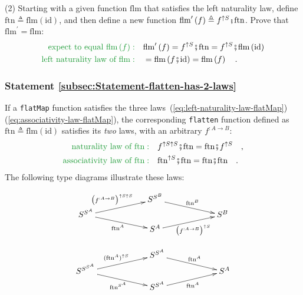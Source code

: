 (2) Starting with a given function $\text{flm}$ that satisfies the
left naturality law, define $\text{ftn}\triangleq\text{flm}\left(\text{id}\right)$,
and then define a new function $\text{flm}^{\prime}\left(f\right)\triangleq f^{\uparrow S}\bef\text{ftn}$.
Prove that $\text{flm}^{\prime}=\text{flm}$:
\begin{align*}
{\color{greenunder}\text{expect to equal }\text{flm}\left(f\right):}\quad & \text{flm}^{\prime}\left(f\right)=f^{\uparrow S}\bef\text{ftn}=f^{\uparrow S}\bef\text{flm}\left(\text{id}\right)\\
{\color{greenunder}\text{left naturality law of }\text{flm}:}\quad & =\text{flm}\left(f\bef\text{id}\right)=\text{flm}\left(f\right)\quad.
\end{align*}


\subsubsection{Statement \label{subsec:Statement-flatten-has-2-laws}\ref{subsec:Statement-flatten-has-2-laws}}

If a \lstinline!flatMap! function satisfies the three laws~(\ref{eq:left-naturality-law-flatMap})\textendash (\ref{eq:associativity-law-flatMap}),
the corresponding \lstinline!flatten! function defined as $\text{ftn}\triangleq\text{flm}\left(\text{id}\right)$
satisfies its \emph{two} laws, with an arbitrary $f^{:A\rightarrow B}$:
\begin{align}
{\color{greenunder}\text{naturality law of }\text{ftn}:}\quad & f^{\uparrow S\uparrow S}\bef\text{ftn}=\text{ftn}\bef f^{\uparrow S}\quad,\label{eq:naturality-law-of-flatten}\\
{\color{greenunder}\text{associativity law of }\text{ftn}:}\quad & \text{ftn}^{\uparrow S}\bef\text{ftn}=\text{ftn}\bef\text{ftn}\quad.\label{eq:associativity-law-of-flatten}
\end{align}
The following type diagrams illustrate these laws:

\vspace{-1.5\baselineskip}
\begin{minipage}[t]{0.45\columnwidth}%
\[
\xymatrix{\xyScaleY{0.2pc}\xyScaleX{5pc} & S^{S^{B}}\ar[rd]\sp(0.5){\ \text{ftn}^{B}}\\
S^{S^{A}}\ar[ru]\sp(0.5){\big(f^{:A\rightarrow B}\big)^{\uparrow S\uparrow S}\ \ }\ar[rd]\sb(0.5){\text{ftn}^{A}\,} &  & S^{B}\\
 & S^{A}\ar[ru]\sb(0.5){\big(f^{:A\rightarrow B}\big)^{\uparrow S}}
}
\]
%
\end{minipage}\hfill{}%
\begin{minipage}[t]{0.45\columnwidth}%
\[
\xymatrix{\xyScaleY{0.2pc}\xyScaleX{5pc} & S^{S^{A}}\ar[rd]\sp(0.5){\ \text{ftn}^{A}}\\
S^{S^{S^{A}}}\ar[ru]\sp(0.5){(\text{ftn}^{A})^{\uparrow S}\ }\ar[rd]\sb(0.5){\text{ftn}^{S^{A}}\,} &  & S^{A}\\
 & S^{S^{A}}\ar[ru]\sb(0.5){\text{ftn}^{A}}
}
\]
%
\end{minipage}


